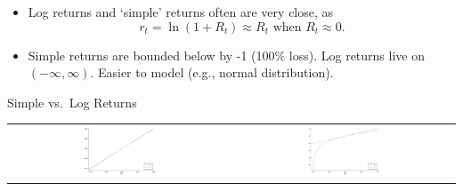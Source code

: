 \begin{frame}%
\begin{itemize}
\item Log returns and `simple' returns often are very close, as
\[
 r_{t} = \ln(1+R_{t}) \approx R_{t}\mbox{ when } R_{t} \approx 0.
\]
\item Simple returns are bounded below by -1 (100\% loss). Log returns live on $(-\infty, \infty)$. Easier to model (e.g., normal distribution).

\end{itemize}

\begin{block}{Simple vs.\ Log Returns}
\begin{center}
\begin{tabular}{cc}
\includegraphics[width=0.35\textwidth]{returns1}&\includegraphics[width=0.35\textwidth]{returns2}
\end{tabular}
\end{center}
\end{block}

\end{frame}%
